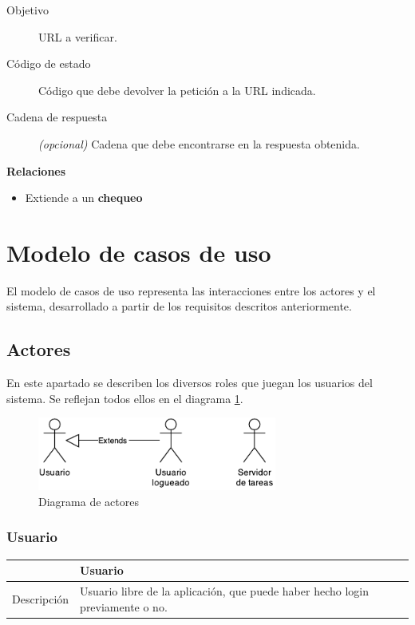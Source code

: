 \begin{description}
\item[Objetivo] URL a verificar.
\item[Código de estado] Código que debe devolver la petición a la URL indicada.
\item[Cadena de respuesta] \textit{(opcional)} Cadena que debe encontrarse en la
  respuesta obtenida.
\end{description}

\textbf{Relaciones}

\begin{itemize}
\item Extiende a un \textbf{chequeo}
\end{itemize}

\section{Modelo de casos de uso}

El modelo de casos de uso representa las interacciones entre los actores y el
sistema, desarrollado a partir de los requisitos descritos anteriormente.

\subsection{Actores}

En este apartado se describen los diversos roles que juegan los usuarios del
sistema. Se reflejan todos ellos en el diagrama \ref{fig:actores}.

\begin{figure}[h]
  \centering
  \includegraphics[width=0.7\textwidth]{4_analisis/diagrama_actores}
  \caption{Diagrama de actores}
  \label{fig:actores}
\end{figure}

\subsubsection{Usuario}

\begin{center}
  \begin{tabularx}{\textwidth}{|c|X|}
    \hline
     & Usuario \\

    \hline

    Descripción & Usuario libre de la aplicación, que puede haber hecho login previamente o no. \\

    \hline
  \end{tabularx}

\end{center}


